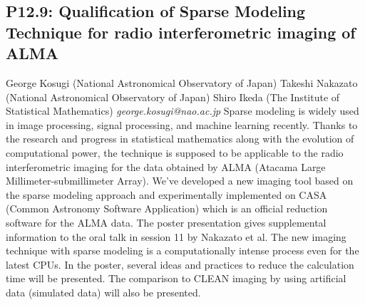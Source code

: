 \documentclass{report}
\begin{document}
\subsection*{P12.9: Qualification of Sparse Modeling Technique for radio interferometric imaging of ALMA}
\bigskip
George Kosugi (National Astronomical Observatory of Japan) \newline Takeshi Nakazato (National Astronomical Observatory of Japan) \newline  Shiro Ikeda (The Institute of Statistical Mathematics)\newline   \newline  \newline  \newline\newline
{\it george.kosugi@nao.ac.jp}\newline
\newline\newline
Sparse modeling is widely used in image processing, signal processing, and machine learning recently. Thanks to the research and progress in statistical mathematics along with the evolution of computational power, the technique is supposed to be applicable to the radio interferometric imaging for the data obtained by ALMA (Atacama Large Millimeter-submillimeter Array). We've developed a new imaging tool based on the sparse modeling approach and experimentally implemented on CASA (Common Astronomy Software Application) which is an official reduction software for the ALMA data. The poster presentation gives supplemental information to the oral talk in session 11 by Nakazato et al. The new imaging technique with sparse modeling is a computationally intense process even for the latest CPUs. In the poster, several ideas and practices to reduce the calculation time will be presented. The comparison to CLEAN imaging by using artificial data (simulated data) will also be presented.\newline
\newpage
\end{document}
